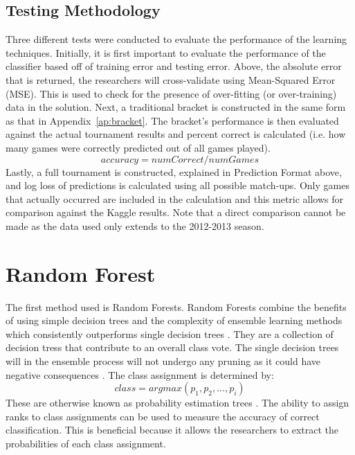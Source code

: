 \documentclass[conference]{IEEEtran}
\begin{document}
{\subsection{Testing Methodology}
Three different tests were conducted to evaluate the performance of the learning techniques.
Initially, it is first important to evaluate the performance of the classifier based off of training error and testing error.
Above, the absolute error that is returned, the researchers will cross-validate using Mean-Squared Error (MSE).
This is used to check for the presence of over-fitting (or over-training) data in the solution.
Next, a traditional bracket is constructed in the same form as that in Appendix~\ref{ap:bracket}. The bracket's performance is then evaluated against the actual tournament results and percent correct is calculated (i.e. how many games were correctly predicted out of all games played).
\begin{equation}
accuracy = numCorrect/numGames
\label{pred-accuracy}
\end{equation}
Lastly, a full tournament is constructed, explained in Prediction Format above, and log loss of predictions is calculated using all possible match-ups. 
Only games that actually occurred are included in the calculation and this metric allows for comparison against the Kaggle results. 
Note that a direct comparison cannot be made as the data used only extends to the 2012-2013 season.

\section{Random Forest}
The first method used is Random Forests. 
Random Forests combine the benefits of using simple decision trees and the complexity of ensemble learning methods which consistently outperforms single decision trees \cite{THOMASG.DIETTERICH:1999}.
They are a collection of decision tress that contribute to an overall class vote.
The single decision trees will in the ensemble process will not undergo any pruning as it could have negative consequences \cite{THOMASG.DIETTERICH:1999}. 
The class assignment is determined by:
\begin{equation}
class = argmax(p_1, p_2,...,p_i)
\end{equation}
These are otherwise known as probability estimation trees \cite{THOMASG.DIETTERICH:1999}.
The ability to assign ranks to class assignments can be used to measure the accuracy of correct classification.
This is beneficial because it allows the researchers to extract the probabilities of each class assignment. 

}
\end{document}
